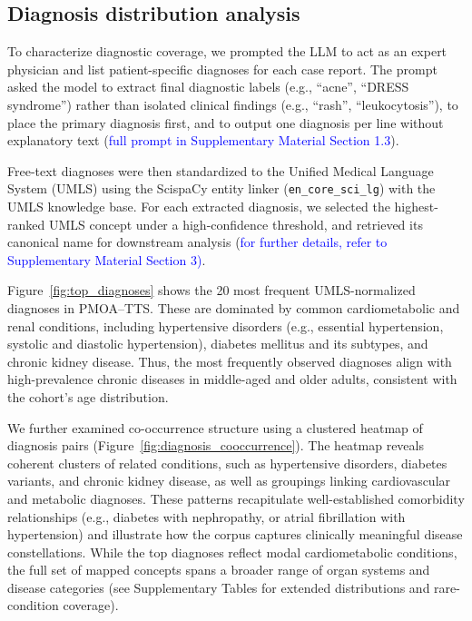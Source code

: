 \documentclass[pdflatex,sn-mathphys-num]{sn-jnl}%
\theoremstyle{thmstyleone}%
\theoremstyle{thmstyletwo}%
\theoremstyle{thmstylethree}%
\begin{document}
\subsection{Diagnosis distribution analysis}

To characterize diagnostic coverage, we prompted the LLM to act as an expert physician and list patient-specific diagnoses for each case report. 
The prompt asked the model to extract final diagnostic labels (e.g., ``acne'', ``DRESS syndrome'') rather than isolated clinical findings (e.g., ``rash'', ``leukocytosis''), to place the primary diagnosis first, and to output one diagnosis per line without explanatory text (\textcolor{blue}{full prompt in Supplementary Material Section 1.3}).

Free-text diagnoses were then standardized to the Unified Medical Language System (UMLS) using the ScispaCy entity linker (\texttt{en\_core\_sci\_lg}) with the UMLS knowledge base. 
For each extracted diagnosis, we selected the highest-ranked UMLS concept under a high-confidence threshold, and retrieved its canonical name for downstream analysis (\textcolor{blue}{for further details, refer to Supplementary Material Section 3)}.

Figure~\ref{fig:top_diagnoses} shows the 20 most frequent UMLS-normalized diagnoses in PMOA--TTS. 
These are dominated by common cardiometabolic and renal conditions, including hypertensive disorders (e.g., essential hypertension, systolic and diastolic hypertension), diabetes mellitus and its subtypes, and chronic kidney disease. 
Thus, the most frequently observed diagnoses align with high-prevalence chronic diseases in middle-aged and older adults, consistent with the cohort's age distribution.

We further examined co-occurrence structure using a clustered heatmap of diagnosis pairs (Figure~\ref{fig:diagnosis_cooccurrence}). 
The heatmap reveals coherent clusters of related conditions, such as hypertensive disorders, diabetes variants, and chronic kidney disease, as well as groupings linking cardiovascular and metabolic diagnoses. 
These patterns recapitulate well-established comorbidity relationships (e.g., diabetes with nephropathy, or atrial fibrillation with hypertension) and illustrate how the corpus captures clinically meaningful disease constellations. 
While the top diagnoses reflect modal cardiometabolic conditions, the full set of mapped concepts spans a broader range of organ systems and disease categories (see Supplementary Tables for extended distributions and rare-condition coverage).
\end{document}
